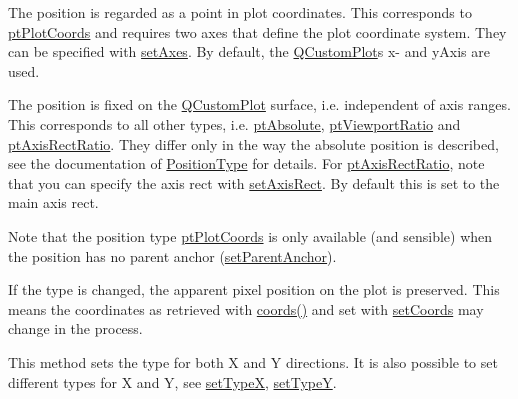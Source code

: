 \begin{DoxyItemize}
\item The position is regarded as a point in plot coordinates. This corresponds to \hyperlink{class_q_c_p_item_position_aad9936c22bf43e3d358552f6e86dbdc8ad5ffb8dc99ad73263f7010c77342294c}{pt\+Plot\+Coords} and requires two axes that define the plot coordinate system. They can be specified with \hyperlink{class_q_c_p_item_position_a2185f45c75ac8cb9be89daeaaad50e37}{set\+Axes}. By default, the \hyperlink{class_q_custom_plot}{Q\+Custom\+Plot}\textquotesingle{}s x-\/ and y\+Axis are used.\end{DoxyItemize}
\begin{DoxyItemize}
\item The position is fixed on the \hyperlink{class_q_custom_plot}{Q\+Custom\+Plot} surface, i.\+e. independent of axis ranges. This corresponds to all other types, i.\+e. \hyperlink{class_q_c_p_item_position_aad9936c22bf43e3d358552f6e86dbdc8a564f5e53e550ead1ec5fc7fc7d0b73e0}{pt\+Absolute}, \hyperlink{class_q_c_p_item_position_aad9936c22bf43e3d358552f6e86dbdc8ac7d6aa89ceacb39658b0d6da061c789a}{pt\+Viewport\+Ratio} and \hyperlink{class_q_c_p_item_position_aad9936c22bf43e3d358552f6e86dbdc8a01080fd00eaf09fa238ef6b73bbfef75}{pt\+Axis\+Rect\+Ratio}. They differ only in the way the absolute position is described, see the documentation of \hyperlink{class_q_c_p_item_position_aad9936c22bf43e3d358552f6e86dbdc8}{Position\+Type} for details. For \hyperlink{class_q_c_p_item_position_aad9936c22bf43e3d358552f6e86dbdc8a01080fd00eaf09fa238ef6b73bbfef75}{pt\+Axis\+Rect\+Ratio}, note that you can specify the axis rect with \hyperlink{class_q_c_p_item_position_a0cd9b326fb324710169e92e8ca0041c2}{set\+Axis\+Rect}. By default this is set to the main axis rect.\end{DoxyItemize}
Note that the position type \hyperlink{class_q_c_p_item_position_aad9936c22bf43e3d358552f6e86dbdc8ad5ffb8dc99ad73263f7010c77342294c}{pt\+Plot\+Coords} is only available (and sensible) when the position has no parent anchor (\hyperlink{class_q_c_p_item_position_ac094d67a95d2dceafa0d50b9db3a7e51}{set\+Parent\+Anchor}).

If the type is changed, the apparent pixel position on the plot is preserved. This means the coordinates as retrieved with \hyperlink{class_q_c_p_item_position_a253d7adbb6d46299bd6cbc31aa8819f1}{coords()} and set with \hyperlink{class_q_c_p_item_position_aa988ba4e87ab684c9021017dcaba945f}{set\+Coords} may change in the process.

This method sets the type for both X and Y directions. It is also possible to set different types for X and Y, see \hyperlink{class_q_c_p_item_position_a2113b2351d6d00457fb3559a4e20c3ea}{set\+Type\+X}, \hyperlink{class_q_c_p_item_position_ac2a454aa5a54c1615c50686601ec4510}{set\+Type\+Y}. 

